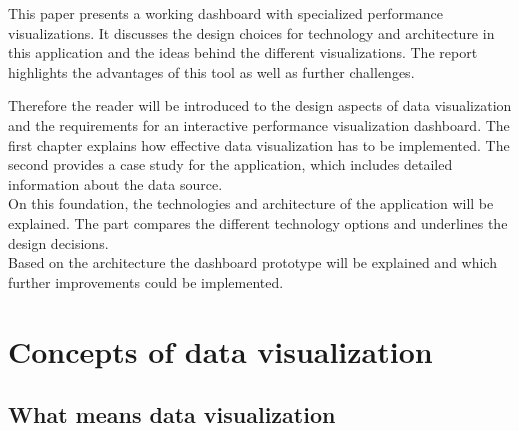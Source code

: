 \documentclass[american,a4paper,oneside,,tablecaptionabove]{scrbook}
\begin{document}
This paper presents a working dashboard with specialized performance
visualizations. It discusses the design choices for technology and
architecture in this application and the ideas behind the different
visualizations. The report highlights the advantages of this tool as
well as further challenges.

Therefore the reader will be introduced to the design aspects of data
visualization and the requirements for an interactive performance
visualization dashboard. The first chapter explains how effective data
visualization has to be implemented. The second provides a case study
for the application, which includes detailed information about the data
source.\\
On this foundation, the technologies and architecture of the application
will be explained. The part compares the different technology options
and underlines the design decisions.\\
Based on the architecture the dashboard prototype will be explained and
which further improvements could be implemented.

\chapter{Concepts of data
visualization}\label{concepts-of-data-visualization}

\section{What means data
visualization}\label{what-means-data-visualization}
\end{document}
